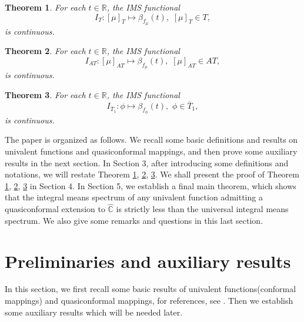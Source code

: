 \documentclass[11pt]{amsart}
\newtheorem{theorem}{Theorem}[section]
\theoremstyle{remark}
\theoremstyle{claim}
\theoremstyle{definition}
\theoremstyle{problem}
\theoremstyle{conjecture}
\theoremstyle{question}
\numberwithin{equation}{section}
\begin{document}
\begin{theorem}\label{m-1}
For each $t\in \mathbb{R}$,  the IMS functional $$I_{{T}}: [\mu]_T  \mapsto  \beta_{f_{\mu}}(t), \,\, [\mu]_T \in {T},$$
is continuous.
\end{theorem}

\begin{theorem}\label{m-2}
For each $t\in \mathbb{R}$, the IMS functional $$I_{{AT}}: [\mu]_{AT}  \mapsto  \beta_{f_{\mu}}(t), \,\, [\mu]_{AT} \in {AT},$$
is continuous.
\end{theorem}

\begin{theorem}\label{m-3}
For each $t\in \mathbb{R}$, the IMS functional $$I_{\overline{T}_1}: \phi  \mapsto \beta_{f_{\phi}}(t), \,\, \phi \in \overline{T}_1,$$
is continuous.
\end{theorem}

The paper is organized as follows. We recall some basic definitions and results on univalent functions and quasiconformal mappings, and then prove some auxiliary results in the next section.  In Section 3,  after introducing some definitions and notations, we will restate Theorem \ref{m-1}, \ref{m-2}, \ref{m-3}. We shall present the proof of  Theorem \ref{m-1}, \ref{m-2}, \ref{m-3} in Section 4. In Section 5, we establish a final main theorem, which shows that the integral means spectrum of any univalent function admitting a quasiconformal extension  to $\widehat{\mathbb{C}}$ is strictly less than the universal integral means spectrum. We also give some remarks and questions in this last section.

\section{\bf {Preliminaries and auxiliary results}}
In this section, we first recall some basic results of univalent functions(conformal mappings) and quasiconformal mappings, for references,  see \cite{Du, Po, L, LV}. Then we establish some auxiliary results which will be needed later.
\end{document}
